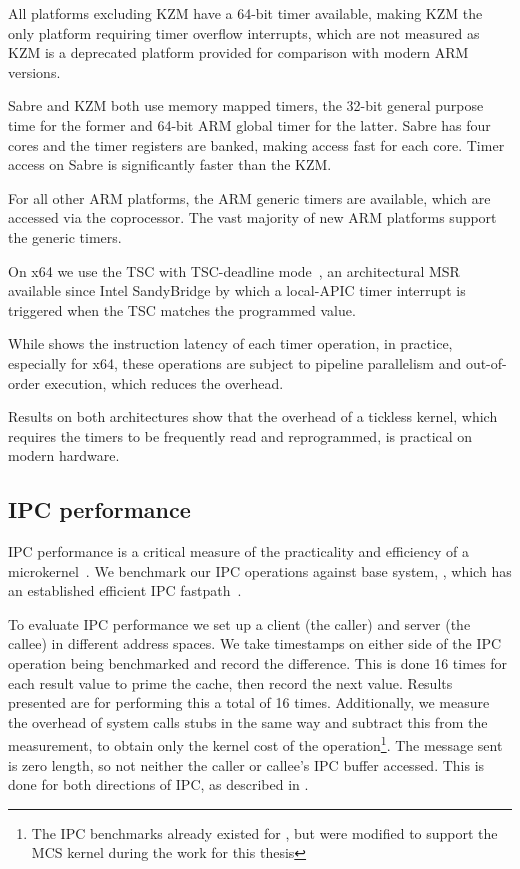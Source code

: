 All platforms excluding \textsc{KZM} have a 64-bit timer available, making \textsc{KZM} the only platform requiring
timer overflow interrupts, which are not measured as \textsc{KZM} is a deprecated platform provided for comparison
with modern ARM versions.

Sabre and KZM both use memory mapped timers, the 32-bit general purpose time for the former and
64-bit ARM global timer for the latter. Sabre has four cores and the timer registers are banked,
making access fast for each core. Timer access on Sabre is significantly faster than the KZM. 

For all other ARM platforms, the ARM generic timers are available, which are accessed via the
coprocessor. The vast majority of new ARM platforms support the generic timers. 

On x64 we use the \gls{TSC} with \gls{TSC}-deadline mode~\citep{Intel_64_IA-32:asdmspg_325384}, an architectural \gls{MSR} available since
Intel SandyBridge by which a local-APIC timer interrupt is triggered when the \gls{TSC} matches the
programmed value. 

While  shows the instruction latency of each timer operation, in practice, especially
for x64, these operations are subject to pipeline parallelism and out-of-order execution, which
reduces the overhead.

Results on both architectures show that the overhead of a tickless kernel, which requires the timers
to be frequently read and reprogrammed, is practical on modern hardware.

\subsection{IPC performance}

\Gls{IPC} performance is a critical measure of the practicality and efficiency of a
microkernel~\citep{Liedtke_95}. We benchmark our \gls{IPC} operations against base system, \selfour,
which has an established efficient \gls{IPC} fastpath~\citep{Elphinstone_Heiser_13}. 

To evaluate IPC performance we set up a client (the caller) and server (the callee) in different
address spaces. We take
timestamps on either side of the IPC operation being benchmarked and record the difference. This is
done 16 times for each result value to prime the cache, then record the next value. Results
presented are for performing this a total of 16 times. Additionally, we measure the overhead of
system calls stubs in the same way and subtract this from the measurement, to obtain only the kernel
cost of the operation\footnote{The \gls{IPC} benchmarks already existed for \selfour, but were modified to
    support the \gls{MCS} kernel during the work for this thesis}. The message sent is zero length, so not
neither the caller or callee's \gls{IPC} buffer accessed.
This is done for both directions of IPC, as described in . 

